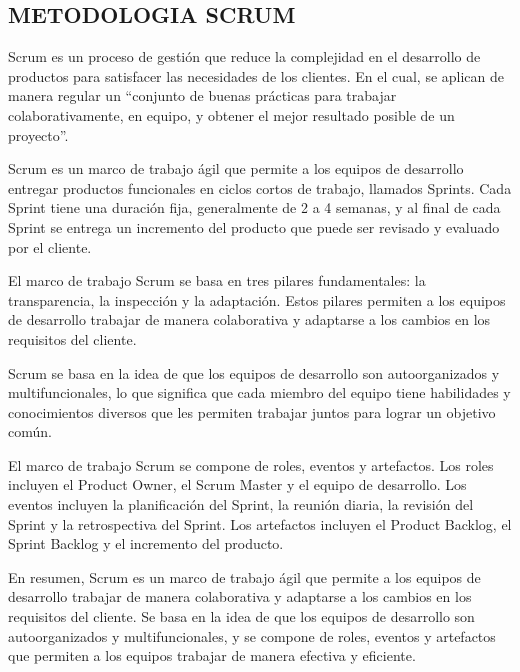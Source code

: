 

\newcommand{\jira}{img/jira.png}
\newcommand{\architec}{img/arquitec.png}
\newcommand{\github}{img/github.png}
\newcommand{\project}{img/project.png}
\newcommand{\python}{img/python.png}
\newcommand{\javas}{img/javas.png}
\newcommand{\flask}{img/flask.png}
\newcommand{\html}{img/html.png}
\newcommand{\css}{img/css.png}
\newcommand{\tailwind}{img/tailwind.png}
\newcommand{\postgre}{img/postgre.png}
\newcommand{\aws}{img/aws.png}
\newcommand{\traslate}{img/traslate.png}
\begin{doublespace}     %
    \section{METODOLOGIA SCRUM}
    Scrum es un proceso de gestión que reduce la complejidad en el desarrollo de productos
    para satisfacer las necesidades de los clientes. En el cual, se aplican de manera regular un
    “conjunto de buenas prácticas para trabajar colaborativamente, en equipo, y obtener el mejor
    resultado posible de un proyecto”. \par
    Scrum es un marco de trabajo ágil que permite a los equipos de desarrollo entregar productos
    funcionales en ciclos cortos de trabajo, llamados Sprints. Cada Sprint tiene una duración
    fija, generalmente de 2 a 4 semanas, y al final de cada Sprint se entrega un incremento del
    producto que puede ser revisado y evaluado por el cliente. \par
    El marco de trabajo Scrum se basa en tres pilares fundamentales: la transparencia, la
    inspección y la adaptación. Estos pilares permiten a los equipos de desarrollo trabajar de
    manera colaborativa y adaptarse a los cambios en los requisitos del cliente. \par
    Scrum se basa en la idea de que los equipos de desarrollo son autoorganizados y
    multifuncionales, lo que significa que cada miembro del equipo tiene habilidades y
    conocimientos diversos que les permiten trabajar juntos para lograr un objetivo común. \par
    El marco de trabajo Scrum se compone de roles, eventos y artefactos. Los roles incluyen el
    Product Owner, el Scrum Master y el equipo de desarrollo. Los eventos incluyen la
    planificación del Sprint, la reunión diaria, la revisión del Sprint y la retrospectiva del
    Sprint. Los artefactos incluyen el Product Backlog, el Sprint Backlog y el incremento del
    producto. \par
    En resumen, Scrum es un marco de trabajo ágil que permite a los equipos de desarrollo
    trabajar de manera colaborativa y adaptarse a los cambios en los requisitos del cliente. Se
    basa en la idea de que los equipos de desarrollo son autoorganizados y multifuncionales,
    y se compone de roles, eventos y artefactos que permiten a los equipos trabajar de manera
    efectiva y eficiente. \par




\end{doublespace}
